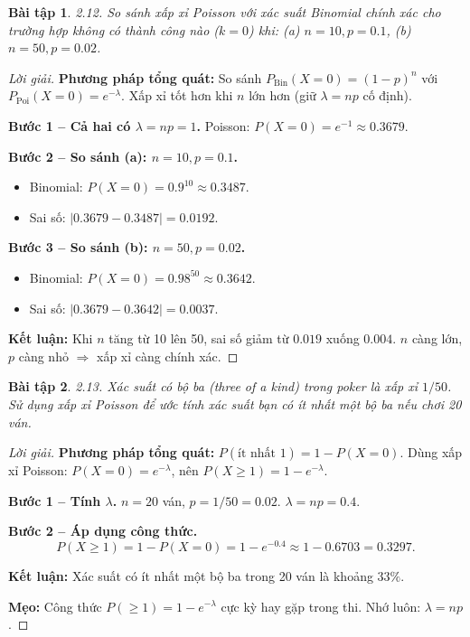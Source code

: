 \documentclass[8pt,a4paper]{article}
\newtheorem{exercise}{Bài tập}
\newenvironment{solution}{\begin{proof}[Lời giải]}{\end{proof}}
\begin{document}
\begin{exercise}
2.12. So sánh xấp xỉ Poisson với xác suất Binomial chính xác cho trường hợp không có thành công nào ($k=0$) khi: (a) $n=10, p=0.1$, (b) $n=50, p=0.02$.
\end{exercise}
\begin{solution}
\textbf{Phương pháp tổng quát:} So sánh $P_{\text{Bin}}(X=0) = (1-p)^n$ với $P_{\text{Poi}}(X=0) = e^{-\lambda}$. Xấp xỉ tốt hơn khi $n$ lớn hơn (giữ $\lambda = np$ cố định).

\textbf{Bước 1 -- Cả hai có $\lambda = np = 1$.} Poisson: $P(X=0) = e^{-1} \approx 0.3679$.

\textbf{Bước 2 -- So sánh (a): $n=10, p=0.1$.}
\begin{itemize}[nosep]
  \item Binomial: $P(X=0) = 0.9^{10} \approx 0.3487$.
  \item Sai số: $|0.3679 - 0.3487| = 0.0192$.
\end{itemize}

\textbf{Bước 3 -- So sánh (b): $n=50, p=0.02$.}
\begin{itemize}[nosep]
  \item Binomial: $P(X=0) = 0.98^{50} \approx 0.3642$.
  \item Sai số: $|0.3679 - 0.3642| = 0.0037$.
\end{itemize}

\textbf{Kết luận:} Khi $n$ tăng từ 10 lên 50, sai số giảm từ $0.019$ xuống $0.004$. $n$ càng lớn, $p$ càng nhỏ $\Rightarrow$ xấp xỉ càng chính xác.
\end{solution}

\begin{exercise}
2.13. Xác suất có bộ ba (three of a kind) trong poker là xấp xỉ $1/50$. Sử dụng xấp xỉ Poisson để ước tính xác suất bạn có ít nhất một bộ ba nếu chơi 20 ván.
\end{exercise}
\begin{solution}
\textbf{Phương pháp tổng quát:} $P(\text{ít nhất 1}) = 1 - P(X=0)$. Dùng xấp xỉ Poisson: $P(X=0) = e^{-\lambda}$, nên $P(X \geq 1) = 1 - e^{-\lambda}$.

\textbf{Bước 1 -- Tính $\lambda$.} $n = 20$ ván, $p = 1/50 = 0.02$. $\lambda = np = 0.4$.

\textbf{Bước 2 -- Áp dụng công thức.}
\[
  P(X \geq 1) = 1 - P(X=0) = 1 - e^{-0.4} \approx 1 - 0.6703 = \boxed{0.3297}.
\]

\textbf{Kết luận:} Xác suất có ít nhất một bộ ba trong 20 ván là khoảng $33\%$.

\textbf{Mẹo:} Công thức $P(\geq 1) = 1 - e^{-\lambda}$ cực kỳ hay gặp trong thi. Nhớ luôn: $\lambda = np$.
\end{solution}
\end{document}
